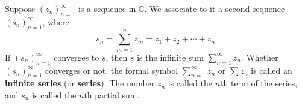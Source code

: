 Suppose $(z_n)_{n=1}^{\infty}$ is a sequence in $\mathbb{C}$. We associate to it a second sequence $(s_n)_{n=1}^{\infty}$, where
$$s_n = \sum_{m=1}^{n} z_m = z_1 + z_2 + \cdots + z_n.$$
If $(s_n)_{n=1}^{\infty}$ converges to $s$, then $s$ is the infinite sum $\sum_{n=1}^{\infty} z_n$. Whether $(s_n)_{n=1}^{\infty}$ converges or not, the formal symbol $\sum_{n=1}^{\infty} z_n$ or $\sum z_n$ is called an \textbf{infinite series} (or \textbf{series}). The number $z_n$ is called the $n$th term of the series, and $s_n$ is called the $n$th partial sum.
